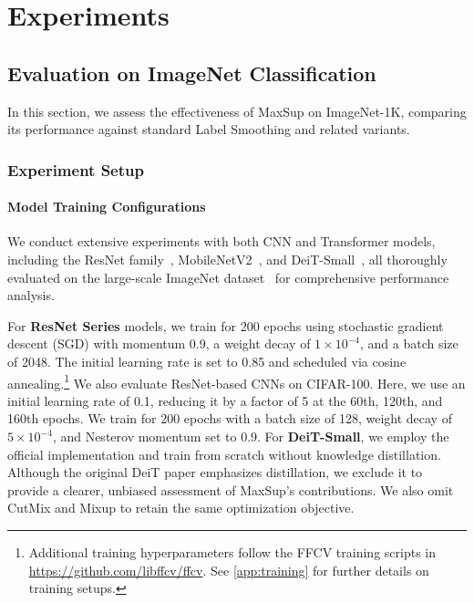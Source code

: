 \section{Experiments}

\subsection{Evaluation on ImageNet Classification}
\label{sec:results}

In this section, we assess the effectiveness of MaxSup on ImageNet-1K, comparing its performance against standard Label Smoothing and related variants.

\subsubsection{Experiment Setup}
\label{sec:train1}

\paragraph{Model Training Configurations}  
We conduct extensive experiments with both CNN and Transformer models, including the ResNet family~\citep{he2016deep}, MobileNetV2~\citep{sandler2018mobilenetv2}, and DeiT-Small~\citep{touvron2021training}, all thoroughly evaluated on the large-scale ImageNet dataset~\citep{krizhevsky2012imagenet} for comprehensive performance analysis.

For \textbf{ResNet Series} models, we train for 200 epochs using stochastic gradient descent (SGD) with momentum 0.9, a weight decay of $1\times10^{-4}$, and a batch size of 2048. The initial learning rate is set to 0.85 and scheduled via cosine annealing.\footnote{Additional training hyperparameters follow the FFCV training scripts in \url{https://github.com/libffcv/ffcv}. See \cref{app:training} for further details on training setups.} 
We also evaluate ResNet-based CNNs on CIFAR-100. Here, we use an initial learning rate of 0.1, reducing it by a factor of 5 at the 60th, 120th, and 160th epochs. We train for 200 epochs with a batch size of 128, weight decay of $5\times10^{-4}$, and Nesterov momentum set to 0.9.
For \textbf{DeiT-Small}, we employ the official implementation and train from scratch without knowledge distillation. Although the original DeiT paper emphasizes distillation, we exclude it to provide a clearer, unbiased assessment of MaxSup’s contributions. We also omit CutMix and Mixup to retain the same optimization objective.

